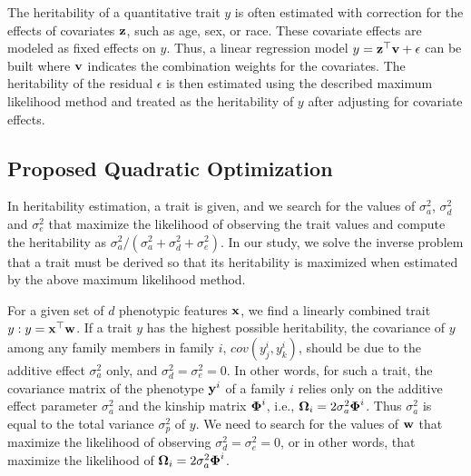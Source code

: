 \documentclass[10pt,letterpaper]{article}
\newcommand{\matrx}[1]{\ensuremath\boldsymbol{\rm #1}}
\newcommand{\vect}[1]{\ensuremath\boldsymbol{\rm #1}}
\begin{document}
The heritability of a quantitative trait $y$ is often estimated with correction for the effects of covariates $\vect z$, such as age, sex, or race.  These covariate effects are modeled as fixed effects on $y$. Thus, a linear regression model $y = \vect z^\top \vect v + \epsilon$ can be built where $\vect v$ indicates the combination weights for the covariates. The heritability of the residual $\epsilon$ is then estimated using the described maximum likelihood method and treated as the heritability of $y$ after adjusting for covariate effects. 


\subsection*{Proposed Quadratic Optimization}
\label{sec:formulation}
In heritability estimation, a trait is given, and we search for the values of $\sigma_a^2$, $\sigma_d^2$ and $\sigma_e^2$ that maximize the likelihood of observing the trait values and compute the heritability as $\sigma_a^2/(\sigma_a^2 + \sigma_d^2 +\sigma_e^2)$. In our study, we solve the inverse problem that a trait must be derived so that its heritability is maximized when estimated by the above maximum likelihood method.  


For a given set of $d$ phenotypic features $\vect x$, we find a linearly combined trait $y: y=\vect x^\top \vect w$. If a trait $y$ has the highest possible heritability, the covariance of $y$ among any family members in family $i$, $cov(y^i_j, y^i_k)$, should be due to the additive effect $\sigma_a^2$ only, and $\sigma_d^2=\sigma_e^2=0$. In other words, for such a trait, the covariance matrix of the phenotype $\vect y^i$ of a family $i$ relies only on the additive effect parameter $\sigma_a^2$ and the kinship matrix $\matrx \Phi^i$, i.e., $\matrx \Omega_i = 2 \sigma_a^2 \matrx \Phi^i$. Thus $\sigma_a^2$ is equal to the total variance $\sigma_p^2$ of $y$. We need to search for the values of $\vect w$ that maximize the likelihood of observing $\sigma_d^2 = \sigma_e^2=0$, or in other words, that maximize the likelihood of $\matrx \Omega_i = 2 \sigma_a^2 \matrx \Phi^i$.
\end{document}
